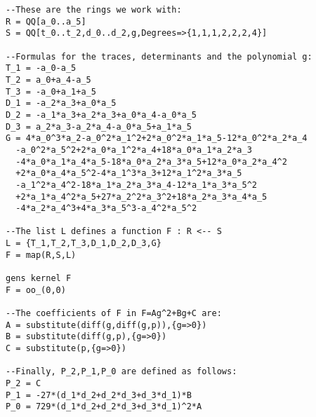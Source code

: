 % 
\begin{lstlisting}
--These are the rings we work with:
R = QQ[a_0..a_5]
S = QQ[t_0..t_2,d_0..d_2,g,Degrees=>{1,1,1,2,2,2,4}]

--Formulas for the traces, determinants and the polynomial g:
T_1 = -a_0-a_5
T_2 = a_0+a_4-a_5
T_3 = -a_0+a_1+a_5
D_1 = -a_2*a_3+a_0*a_5
D_2 = -a_1*a_3+a_2*a_3+a_0*a_4-a_0*a_5
D_3 = a_2*a_3-a_2*a_4-a_0*a_5+a_1*a_5
G = 4*a_0^3*a_2-a_0^2*a_1^2+2*a_0^2*a_1*a_5-12*a_0^2*a_2*a_4
  -a_0^2*a_5^2+2*a_0*a_1^2*a_4+18*a_0*a_1*a_2*a_3
  -4*a_0*a_1*a_4*a_5-18*a_0*a_2*a_3*a_5+12*a_0*a_2*a_4^2
  +2*a_0*a_4*a_5^2-4*a_1^3*a_3+12*a_1^2*a_3*a_5
  -a_1^2*a_4^2-18*a_1*a_2*a_3*a_4-12*a_1*a_3*a_5^2
  +2*a_1*a_4^2*a_5+27*a_2^2*a_3^2+18*a_2*a_3*a_4*a_5
  -4*a_2*a_4^3+4*a_3*a_5^3-a_4^2*a_5^2 
  
--The list L defines a function F : R <-- S
L = {T_1,T_2,T_3,D_1,D_2,D_3,G} 
F = map(R,S,L)

gens kernel F
F = oo_(0,0)

--The coefficients of F in F=Ag^2+Bg+C are:
A = substitute(diff(g,diff(g,p)),{g=>0})
B = substitute(diff(g,p),{g=>0})
C = substitute(p,{g=>0})

--Finally, P_2,P_1,P_0 are defined as follows:
P_2 = C
P_1 = -27*(d_1*d_2+d_2*d_3+d_3*d_1)*B
P_0 = 729*(d_1*d_2+d_2*d_3+d_3*d_1)^2*A
\end{lstlisting}